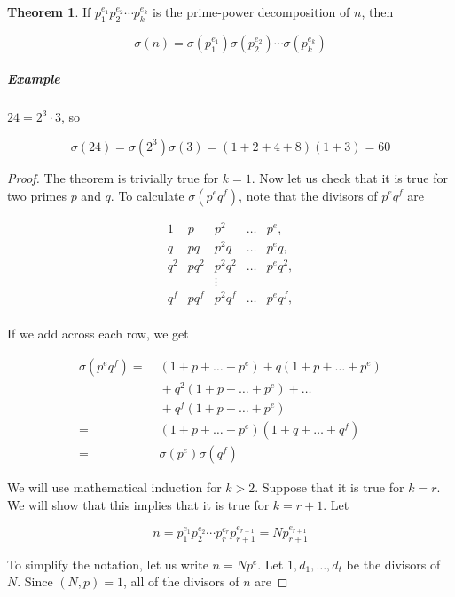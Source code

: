 \documentclass{article}
\theoremstyle{definition} %
\newtheorem{theorem}{Theorem}[section] %
\theoremstyle{definition}
\theoremstyle{definition}
\theoremstyle{definition}
\begin{document}
  \begin{theorem}
    \label{th:divisor_sum_formula}
    If $p_1^{e_1}p_2^{e_2}\cdots p_k^{e_k}$ is the prime-power decomposition of $n$, then
    
    \[ \sigma(n) = \sigma(p_1^{e_1})\sigma(p_2^{e_2})\cdots \sigma(p_k^{e_k}) \]
  \end{theorem}
  
  \subparagraph{Example} $24 = 2^3 \cdot 3$, so
  
  \[ \sigma(24) = \sigma(2^3)\sigma(3) = (1 + 2 +4 + 8)(1 + 3) = 60 \]
  
  \begin{proof}
    The theorem is trivially true for $k = 1$. Now let us check that it is true for
    two primes $p$ and $q$. To calculate $\sigma(p^eq^f)$,
    note that the divisors of $p^eq^f$ are
    
    \[
  \begin{matrix}
    1    & p & p^2 & \dots & p^e, \\
    q    & pq & p^2q & \dots & p^eq, \\
    q^2 & pq^2 & p^2q^2 & \dots & p^eq^2, \\
          &          & \vdots    &   & \\
    q^f & pq^f & p^2q^f & \dots & p^eq^f, \\
  \end{matrix}
    \]
    
    If we add across each row, we get
    
    \begin{align*}
      \sigma(p^eq^f) = &\; (1 + p + \dots + p^e) + q(1 + p + \dots + p^e) \\
       &\; + q^2(1 + p + \dots + p^e) + \dots \\
       &\; + q^f(1 + p + \dots + p^e) \\
       = &\; (1 + p + \dots + p^e)(1 + q + \dots  + q^f) \\
       = &\; \sigma(p^e)\sigma(q^f)
    \end{align*}
  
    We will use mathematical induction for $k > 2$. Suppose that it is true
    for $k = r$. We will show that this implies that it is true for $k = r + 1$. Let
    
    \[ n = p_1^{e_1}p_2^{e_2}\cdots p_r^{e_r}p_{r+1}^{e_{r+1}} = Np_{r+1}^{e_{r+1}} \]
    
    To simplify the notation, let us write $n = Np^e$. Let $1, d_1, \dots, d_t$ be the divisors
    of $N$. Since $(N, p) = 1$, all of the divisors of $n$ are
    

\end{proof}
\end{document}
